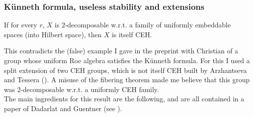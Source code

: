 \subsubsection*{K\"{u}nneth formula, useless stability and extensions} 

\begin{prop}
If for every $r$, $X$ is $2$-decomposable w.r.t. a family of uniformly embeddable spaces (into Hilbert space), then $X$ is itself CEH. 
\end{prop}

This contradicts the (false) example I gave in the preprint with Christian of a group whose uniform Roe algebra satisfies the K\"{u}nneth formula. For this I used a split extension of two CEH groups, which is not itself CEH built by Arzhantseva and Tessera (\cite{arzhantseva2016admitting}). A misuse of the fibering theorem made me believe that this group was $2$-decomposable w.r.t. a uniformly CEH family. \\

The main ingredients for this result are the following, and are all contained in a paper of Dadarlat and Guentner (see \cite{dadarlat2007uniform}). 

